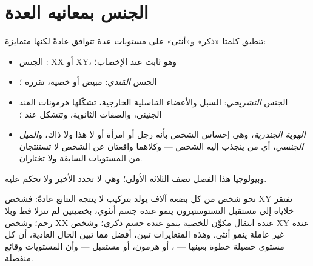 \section{الجنس بمعانيه العدة}

\begin{proposition}\label{prop:g11:becoming-male-female:levels}
تنطبق كلمتا «ذكر» و«أنثى» على مستويات عدة تتوافق عادةً لكنها متمايزة:
\begin{itemize}
  \item الجنس \emph{}: XX أو XY، وهو ثابت عند الإخصاب؛
  \item الجنس \emph{القندي}: مبيض أو خصية، تقرره ؛
  \item الجنس \emph{التشريحي}: السبل والأعضاء التناسلية الخارجية،
        تشكّلها هرمونات القند الجنيني، والصفات الثانوية، وتتشكل عند
        ؛
  \item \emph{الهوية الجندرية}، وهي إحساس الشخص بأنه رجل أو امرأة أو
        لا هذا ولا ذاك، و\emph{الميل الجنسي}، أي من ينجذب إليه الشخص
        --- وكلاهما واقعتان عن الشخص لا تستنتجان من المستويات
        السابقة ولا تختاران.
\end{itemize}
وبيولوجيا هذا الفصل تصف الثلاثة الأولى؛ وهي لا تحدد الأخير ولا تحكم
عليه.
\end{proposition}
\admitted

\begin{example}\label{ex:g11:becoming-male-female:disagree}
نحو شخص من كل بضعة آلاف يولد بتركيب لا ينتجه التتابع عادةً: فشخص XY
تفتقر خلاياه إلى مستقبل التستوستيرون ينمو عنده جسم أنثوي، بخصيتين لم
تنزلا قط وبلا رحم؛ وشخص XX عنده انتقال   مكوِّن للخصية ينمو
عنده جسم ذكري؛ وشخص XY عنده  غير عاملة ينمو أنثى. وهذه المتغايرات
تبين، أفضل مما تبين الحال العادية، أن كل مستوى حصيلة خطوة بعينها ---
، أو هرمون، أو مستقبل --- وأن المستويات وقائع منفصلة.
\end{example}

